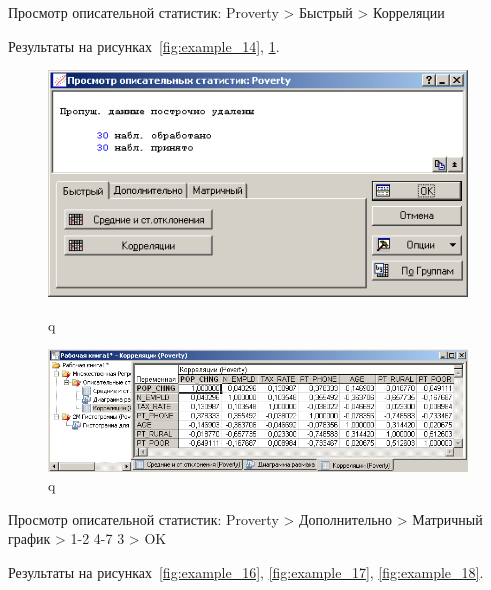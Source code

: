 Просмотр описательной статистик: Proverty > Быстрый > Корреляции

Результаты на рисунках~\ref{fig:example_14}, \ref{fig:example_15}.

\begin{figure}[!h]
  \centering
  \begin{minipage}{0.29\textwidth}
    \centering

    \includegraphics[width=0.99\textwidth]
    {inc/example_14.PNG}

    \caption{q}
    \label{fig:example_14}
  \end{minipage}
  \begin{minipage}{0.69\textwidth}
    \centering

    \includegraphics[width=0.99\textwidth]
    {inc/example_15.PNG}

    \caption{q}
    \label{fig:example_15}
  \end{minipage}
\end{figure}

Просмотр описательной статистик: Proverty > Дополнительно > Матричный график > 1-2 4-7 3 > OK

Результаты на рисунках~\ref{fig:example_16}, \ref{fig:example_17}, \ref{fig:example_18}.

